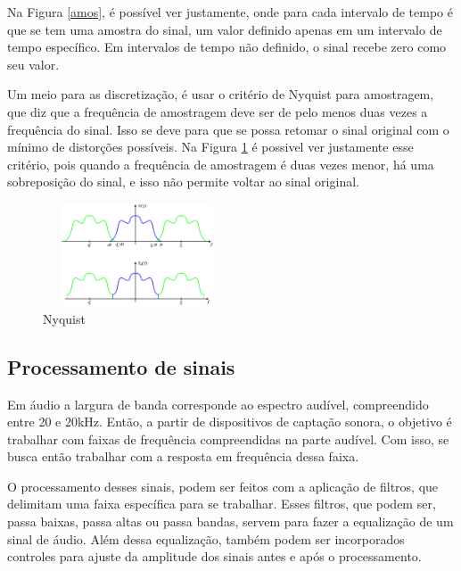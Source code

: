 \documentclass[conference]{IEEEtran}
\begin{document}
Na Figura \ref{amos}, é possível ver justamente, onde para cada intervalo de tempo é que se tem uma amostra do sinal, um valor definido apenas em um intervalo de tempo específico. Em intervalos de tempo não definido, o sinal recebe zero como seu valor.

Um meio para as discretização, é usar o critério de Nyquist para amostragem, que diz que a frequência de amostragem deve ser de pelo menos duas vezes a frequência do sinal. Isso se deve para que se possa retomar o sinal original com o mínimo de distorções possíveis. 
Na Figura \ref{fig_sim} é possivel ver justamente esse critério, pois quando a frequência de amostragem é duas vezes menor, há uma sobreposição do sinal, e isso não permite voltar ao sinal original. \cite{mello2013processamento}

\begin{figure}[!htb]
\centering
\includegraphics[width=2.2in, height = 1.2in]{Imagens/nyquist}
\caption{Nyquist}

\label{fig_sim}
\end{figure}

\subsection{Processamento de sinais}

Em áudio a largura de banda corresponde ao espectro audível, compreendido entre 20 e 20kHz. %
Então, a partir de dispositivos de captação sonora, o objetivo é trabalhar com faixas de frequência compreendidas na parte audível. Com isso, se busca então trabalhar com a resposta em frequência dessa faixa.
\cite{herrera2004projeto}

O processamento desses sinais, podem ser feitos com a aplicação de filtros, que delimitam uma faixa específica para se trabalhar. Esses filtros, que podem ser, passa baixas, passa altas ou passa bandas, servem para fazer a equalização de um sinal de áudio. Além dessa equalização, também podem ser incorporados controles para ajuste da amplitude dos sinais antes e após o processamento.
\cite{ferreira2014processamento}
\end{document}
